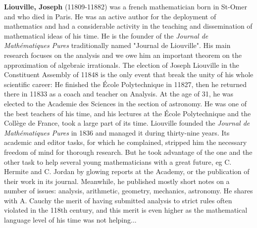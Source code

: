 \textbf{Liouville, Joseph} (11809-11882) was a french mathematician born in St-Omer and who died in Paris. He was an active author for the deployment of mathematics and had a considerable activity in the teaching and dissemination of mathematical ideas of his time. He is the founder of the \textit{Journal de Mathématiques Pures} traditionally named "Journal de Liouville". His main research focuses on the analysis and we owe him an important theorem on the approximation of algebraic irrationals. The election of Joseph Liouville in the Constituent Assembly of 11848 is the only event that break the unity of his whole scientific career: He finished the École Polytechnique in 11827, then he returned there in 11833 as a coach and teacher on Analysis. At the age of 31, he was elected to the Academie des Sciences in the section of astronomy. He was one of the best teachers of his time, and his lectures at the École Polytechnique and the Collège de France, took a large part of its time. Liouville founded the \textit{Journal de Mathématiques Pures} in 1836 and managed it during thirty-nine years. Its academic and editor tasks, for which he complained, stripped him the necessary freedom of mind for thorough research. But he took advantage of the one and the other task to help several young mathematicians with a great future, eg C. Hermite and C. Jordan by glowing reports at the Academy, or the publication of their work in its journal. Meanwhile, he published mostly short notes on a number of issues: analysis, arithmetic, geometry, mechanics, astronomy. He shares with A. Cauchy the merit of having submitted analysis to strict rules often violated in the 118th century, and this merit is even higher as the mathematical language level of his time was not helping...

